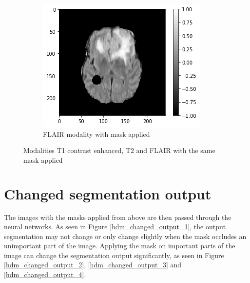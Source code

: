 \begin{figure}[H]
    \begin{subfigure}[t]{.33\textwidth}
        \centering
        \includegraphics[width=\linewidth]{chapters/06_hdm/images_masked/masked_3.png}
        \caption{FLAIR modality with mask applied}
    \end{subfigure}
    \caption{Modalities T1 contrast enhanced, T2 and FLAIR with the same mask applied}
    \label{hdm_masks_2}
\end{figure}



\section{Changed segmentation output}
The images with the masks applied from above are then passed through the neural networks. As seen in Figure \ref{hdm_changed_output_1}, the output segmentation may not change or only change slightly when the mask occludes an unimportant part of the image. Applying the mask on important parts of the image can change the segmentation output significantly, as seen in Figure \ref{hdm_changed_output_2}, \ref{hdm_changed_output_3} and \ref{hdm_changed_output_4}.


